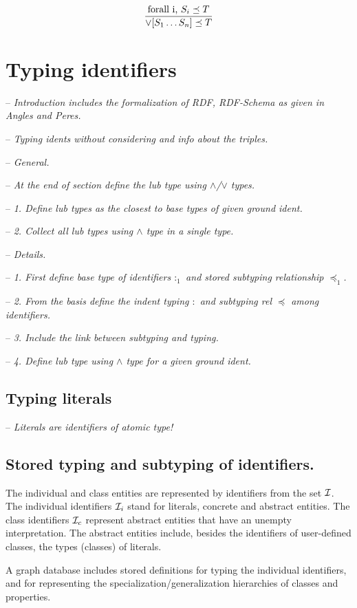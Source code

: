 \documentclass[runningheads]{llncs}
\newcommand{\I}{{\cal I}}
\newcommand{\Ii}{{\cal I}_i}
\newcommand{\Ic}{{\cal I}_c}
\newcommand{\nl}{\hfill\break}
\newcommand{\notes}[1]{\noindent\begin{small}-- \emph{#1}\\\end{small}}
\begin{document}
\begin{equation}
\dfrac{\text{forall i,\ } S_i\preceq\/T}
      {\lor[S_1\ldots\/S_n]\preceq\/T}  
\end{equation}






\section{Typing identifiers}

\notes{Introduction includes the formalization of RDF, RDF-Schema as given in Angles and Peres.}
\notes{Typing idents without considering and info about the triples.}

\notes{General.}
\notes{At the end of section define the lub type using $\land$/$\lor$ types.}
\notes{1. Define lub types as the closest to base types of given ground ident.}
\notes{2. Collect all lub types using $\land$ type in a single type.}

\notes{Details.}
\notes{1. First define base type of identifiers $:_1$ and stored subtyping relationship $\preceq_1$.}
\notes{2. From the basis define the indent typing $:$ and subtyping rel $\preceq$ among identifiers.}
\notes{3. Include the link between subtyping and typing.}
\notes{4. Define lub type using $\land$ type for a given ground ident.}




\subsection{Typing literals}

\notes{Literals are identifiers of atomic type!}





\subsection{Stored typing and subtyping of identifiers.}\nl

The individual and class entities are represented by identifiers from
the set $\I$. The individual identifiers $\Ii$ stand for literals,
concrete and abstract entities. The class identifiers $\Ic$ represent
abstract entities that have an unempty interpretation. The abstract
entities include, besides the identifiers of user-defined classes,
the types (classes) of literals.

A graph database includes stored definitions for typing the individual
identifiers, and for representing the specialization/generalization
hierarchies of classes and properties.
\end{document}
